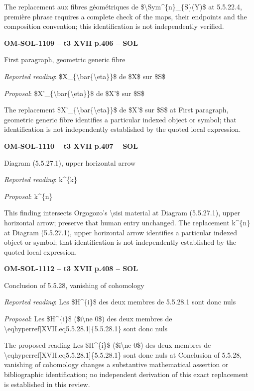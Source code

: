 The replacement aux fibres géométriques de \$\textbackslash{}Sym\textasciicircum{}\{n\}\_\{S\}(Y)\$ at 5.5.22.4, première phrase requires a complete check of the maps, their endpoints and the composition convention; this identification is not independently verified.\par
\par\noindent\textbf{OM-SOL-1109 -- t3 XVII p.406 -- SOL}\par
First paragraph, geometric generic fibre\par
\emph{Reported reading}: \$X\_\{\textbackslash{}bar\{\textbackslash{}eta\}\}\$ de \$X\$ sur \$S\$\par
\emph{Proposal}: \$X'\_\{\textbackslash{}bar\{\textbackslash{}eta\}\}\$ de \$X'\$ sur \$S\$\par
The replacement \$X'\_\{\textbackslash{}bar\{\textbackslash{}eta\}\}\$ de \$X'\$ sur \$S\$ at First paragraph, geometric generic fibre identifies a particular indexed object or symbol; that identification is not independently established by the quoted local expression.\par
\par\noindent\textbf{OM-SOL-1110 -- t3 XVII p.407 -- SOL}\par
Diagram (5.5.27.1), upper horizontal arrow\par
\emph{Reported reading}: k\textasciicircum{}\{k\}\par
\emph{Proposal}: k\textasciicircum{}\{n\}\par
This finding intersects Orgogozo's \textbackslash{}sisi material at Diagram (5.5.27.1), upper horizontal arrow; preserve that human entry unchanged. The replacement k\textasciicircum{}\{n\} at Diagram (5.5.27.1), upper horizontal arrow identifies a particular indexed object or symbol; that identification is not independently established by the quoted local expression.\par
\par\noindent\textbf{OM-SOL-1112 -- t3 XVII p.408 -- SOL}\par
Conclusion of 5.5.28, vanishing of cohomology\par
\emph{Reported reading}: Les \$H\textasciicircum{}\{i\}\$ des deux membres de 5.5.28.1 sont donc nuls\par
\emph{Proposal}: Les \$H\textasciicircum{}\{i\}\$ (\$i\textbackslash{}ne 0\$) des deux membres de \textbackslash{}eqhyperref[XVII.eq5.5.28.1]\{5.5.28.1\} sont donc nuls\par
The proposed reading Les \$H\textasciicircum{}\{i\}\$ (\$i\textbackslash{}ne 0\$) des deux membres de \textbackslash{}eqhyperref[XVII.eq5.5.28.1]\{5.5.28.1\} sont donc nuls at Conclusion of 5.5.28, vanishing of cohomology changes a substantive mathematical assertion or bibliographic identification; no independent derivation of this exact replacement is established in this review.\par
